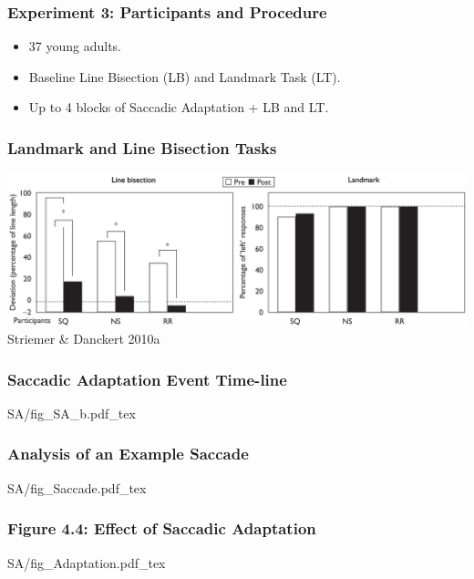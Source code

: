 \documentclass{beamer}
\begin{document}
\begin{frame}[noframenumbering]
	\frametitle{Experiment 3: Participants and Procedure}
	\begin{itemize}
		\item 37 young adults.
		\item Baseline Line Bisection (LB) and Landmark Task (LT).
		\item Up to 4 blocks of Saccadic Adaptation + LB and LT.
	\end{itemize}
\end{frame}


\begin{frame}[noframenumbering]
	\frametitle{Saccadic Adaptation Event Time-line}
	\centering
	\def\svgwidth{\textwidth}
	\tiny
	{SA/fig_SA_b.pdf_tex}
\end{frame}


\begin{frame}[noframenumbering]
	\frametitle{Analysis of an Example Saccade}
	\centering
	\def\svgwidth{\textwidth}
	\tiny
	{SA/fig_Saccade.pdf_tex}
\end{frame}

\begin{frame}[noframenumbering]
	\frametitle{Figure 4.4: Effect of Saccadic Adaptation}
	\centering
	\def\svgwidth{0.9\textwidth}
	\tiny
	{SA/fig_Adaptation.pdf_tex}
\end{frame}
\end{document}
